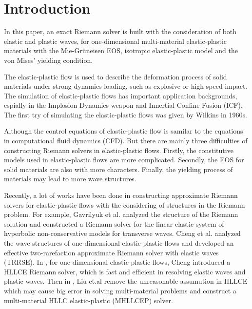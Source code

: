\documentclass[review]{elsarticle}
\begin{document}

\section{Introduction}

In this paper, an exact  Riemann solver is built with the consideration of both elastic and plastic waves, for one-dimensional  multi-material elastic-plastic materials with the Mie-Gr\"uneisen EOS, isotropic elastic-plastic model \cite{wilkins1963calculation} and  the von Mises' yielding condition.

The  elastic-plastic flow  is  used to describe the deformation process of solid materials under strong dynamics loading, such as explosive or high-speed impact. The simulation of elastic-plastic flows has important application backgrounds, espially in the Implosion Dynamics weapon and Innertial Confine Fusion (ICF). The first try of simulating the elastic-plastic flows was given by  Wilkins \cite{wilkins1963calculation} in 1960s.  

Although the control equations of elastic-plastic flow is samilar to the equations in computational fluid dynamics (CFD). But there are mainly three difficulties  of constructing  Riemann solvers in elastic-plastic flows.  Firstly, the constitutive models used in elastic-plastic flows are more complicated. Secondly, the EOS for solid materials are also with more characters. Finally, the yielding process of materials may lead to more wave structures.

Recently, a lot of works have been done in constructing  approximate Riemann solvers for elastic-plastic flows with the considering of structures in the Riemann problem.  For example, Gavrilyuk et al. \cite{gavrilyuk2008modelling} analyzed the structure of the Riemann solution and constructed a Riemann solver for the linear elastic system  of hyperbolic non-conservative models for transverse waves.   Cheng et al. \cite{cheng2015high} analyzed the wave structures of one-dimensional elastic-plastic flows and developed an effective two-rarefaction approximate Riemann solver with elastic waves (TRRSE). 
In \cite{cheng2016harten}, for one-dimensional elastic-plastic flows, Cheng introduced a HLLCE Riemann solver, which is fast and efficient in resolving elastic waves and plastic waves. Then in \cite{liumulti}, Liu et.al remove the unreasonable assumution in HLLCE  which may cause big error in solving  multi-material problems and construct a multi-material HLLC elastic-plastic (MHLLCEP) solver. 
\end{document}
